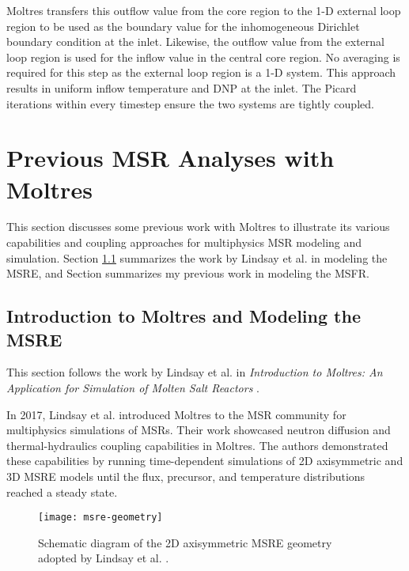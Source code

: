 Moltres transfers this outflow value from the core region to the 1-D
external loop region to be used as the boundary value for the inhomogeneous
Dirichlet boundary
condition at the inlet. Likewise, the outflow value from the external
loop region is used for the inflow value in the central core region. No
averaging is required for this step as the external loop region is a 1-D system.
This approach results in uniform inflow temperature and \gls{DNP} at the
inlet. The Picard iterations within every timestep ensure the two systems
are tightly coupled.

\section{Previous \gls{MSR} Analyses with Moltres} \label{sec:moltres-previous}

This section discusses some previous work with Moltres to illustrate its
various capabilities and coupling approaches for multiphysics \gls{MSR}
modeling and simulation. Section \ref{sec:msre} summarizes the work by Lindsay et
al. \cite{lindsay_introduction_2018} in modeling the \gls{MSRE}, and Section
\cite{park_advancement_2020} summarizes my previous work in modeling the
\gls{MSFR}.

\subsection{Introduction to Moltres and Modeling the MSRE} \label{sec:msre}

This section follows the work by Lindsay et al. in \textit{Introduction to Moltres:
An Application for Simulation of Molten Salt Reactors}
\cite{lindsay_introduction_2018}.

In 2017, Lindsay et al. introduced
Moltres to the \gls{MSR} community for multiphysics simulations of \glspl{MSR}.
Their work showcased neutron diffusion and thermal-hydraulics coupling
capabilities in Moltres. The authors
demonstrated these capabilities by running time-dependent simulations of 2D
axisymmetric and 3D \gls{MSRE} models until the flux, precursor, and
temperature distributions reached a steady state.

\begin{figure}[htb!]
	\centering
	\texttt{[image: msre-geometry]}
	\caption{Schematic diagram of the 2D axisymmetric \gls{MSRE} geometry
	adopted by Lindsay et al. \cite{lindsay_introduction_2018}.}
	\label{fig:msre-geometry}
\end{figure}

